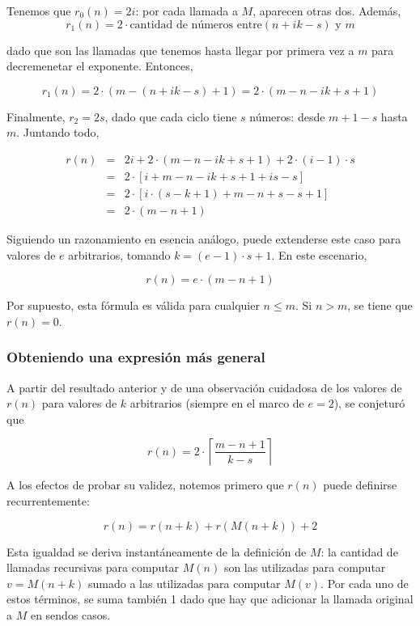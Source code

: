 \documentclass[a4paper,10pt]{article}
\newcommand{\ceil}[1]{\ensuremath{\left\lceil #1 \right\rceil}}
\begin{document}
Tenemos que $r_0(n) = 2i$: por cada llamada a $M$, aparecen otras dos. Adem\'as,
$$r_1(n) = 2  \cdot  \text{cantidad de n\'umeros entre} (n+ik-s) \text{ y } m$$

dado que son las llamadas que tenemos hasta llegar por primera vez a $m$ para decremenetar el exponente. Entonces,

$$r_1(n) = 2 \cdot (m  - (n + ik - s) + 1) = 2 \cdot (m - n - ik + s + 1)$$

Finalmente, $r_2 = 2s$, dado que cada ciclo tiene $s$ n\'umeros: desde $m+1-s$ hasta $m$. Juntando todo,

\begin{eqnarray*}
r(n) &=& 2i + 2 \cdot (m - n - ik + s + 1) + 2 \cdot (i-1) \cdot s \\
     &=& 2 \cdot \left[i + m - n - ik + s + 1 + is - s\right] \\
     &=& 2 \cdot \left[i \cdot (s - k + 1) + m - n + s - s + 1 \right] \\
     &=& 2 \cdot (m - n + 1)
\end{eqnarray*}

Siguiendo un razonamiento en esencia an\'alogo, puede extenderse este caso para valores de $e$ arbitrarios, tomando 
$k = (e-1) \cdot s + 1$. En este escenario,

$$r(n) = e \cdot (m - n + 1)$$

Por supuesto, esta f\'ormula es v\'alida para cualquier $n \leq m$. Si $n > m$, se tiene que $r(n) = 0$.

\subsubsection{Obteniendo una expresi\'on m\'as general}

A partir del resultado anterior y de una observaci\'on cuidadosa de los valores de $r(n)$ para valores de $k$ 
arbitrarios (siempre en el marco de $e = 2$), se conjetur\'o que

$$r(n) = 2 \cdot \ceil{\frac{m - n + 1}{k-s}}$$

A los efectos de probar su validez, notemos primero que $r(n)$ puede definirse recurrentemente:

$$r(n) = r(n+k) + r(M(n+k)) + 2$$

Esta igualdad se deriva instant\'aneamente de la definici\'on de $M$: la cantidad de llamadas recursivas para
computar $M(n)$ son las utilizadas para computar $v = M(n+k)$ sumado a las utilizadas para computar $M(v)$. Por 
cada uno de estos t\'erminos, se suma tambi\'en 1 dado que hay que adicionar la llamada original a $M$ en sendos
casos.\\
\end{document}
